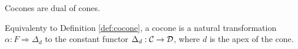 \begin{remark}
	Cocones are dual of cones.
\end{remark}

\begin{definition}
	Equivalenty to Definition \ref{def:cocone}, a cocone is a natural
	transformation $\alpha: F \Rightarrow \Delta_d$ to the constant functor
	$\Delta_d:\mathcal{C}\to \mathcal{D}$, where $d$ is the apex of the cone.
\end{definition}